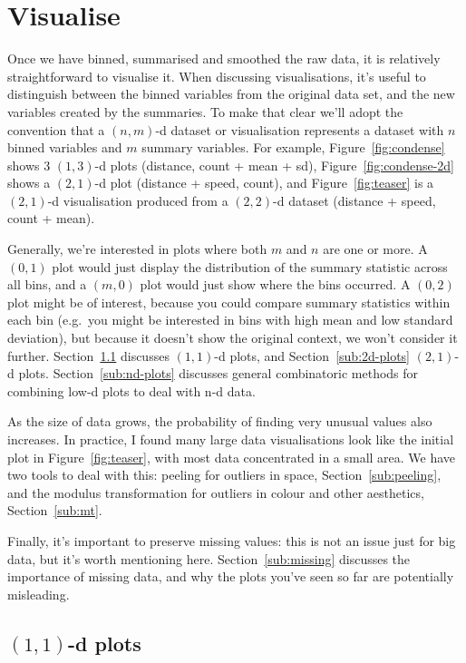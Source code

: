 \documentclass[journal]{vgtc}                %
\begin{document}
\section{Visualise}
\label{sec:visualise}

Once we have binned, summarised and smoothed the raw data, it is relatively straightforward to visualise it. When discussing visualisations, it's useful to distinguish between the binned variables from the original data set, and the new variables created by the summaries. To make that clear we'll adopt the convention that a $(n, m)$-d dataset or visualisation represents a dataset with $n$ binned variables and $m$ summary variables. For example, Figure~\ref{fig:condense} shows 3 $(1, 3)$-d plots (distance, count + mean + sd), Figure~\ref{fig:condense-2d} shows a $(2, 1)$-d plot (distance + speed, count), and Figure~\ref{fig:teaser} is a $(2, 1)$-d visualisation produced from a $(2, 2)$-d dataset (distance + speed, count + mean).

Generally, we're interested in plots where both $m$ and $n$ are one or more. A $(0, 1)$ plot would just display the distribution of the summary statistic across all bins, and a $(m, 0)$ plot would just show where the bins occurred. A $(0, 2)$ plot might be of interest, because you could compare summary statistics within each bin (e.g.\ you might be interested in bins with high mean and low standard deviation), but because it doesn't show the original context, we won't consider it further. Section~\ref{sub:1d-plots} discusses $(1, 1)$-d plots, and Section~\ref{sub:2d-plots} $(2, 1)$-d plots. Section~\ref{sub:nd-plots} discusses general combinatoric methods for combining low-d plots to deal with n-d data.

As the size of data grows, the probability of finding very unusual values also increases. In practice, I found many large data visualisations look like the initial plot in Figure~\ref{fig:teaser}, with most data concentrated in a small area. We have two tools to deal with this: peeling for outliers in space, Section~\ref{sub:peeling}, and the modulus transformation for outliers in colour and other aesthetics, Section~\ref{sub:mt}.

Finally, it's important to preserve missing values: this is not an issue just for big data, but it's worth mentioning here. Section~\ref{sub:missing} discusses the importance of missing data, and why the plots you've seen so far are potentially misleading.

\subsection{\texorpdfstring{$(1,1)$}{(1, 1)}-d plots}
\label{sub:1d-plots}
\end{document}
